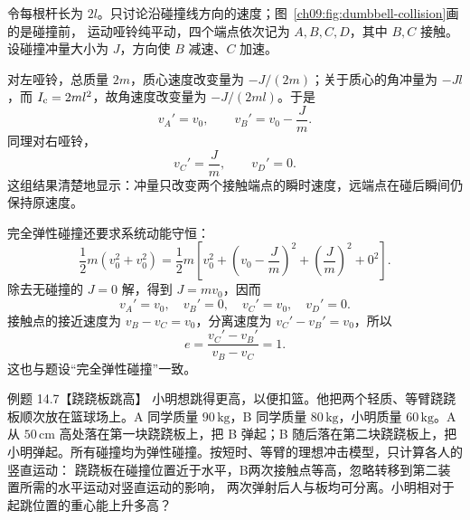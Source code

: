 \begin{xesolution}
令每根杆长为 $2l$。只讨论沿碰撞线方向的速度；图~\ref{ch09:fig:dumbbell-collision}画的是碰撞前，
运动哑铃纯平动，四个端点依次记为
$A,B,C,D$，其中 $B,C$ 接触。设碰撞冲量大小为 $J$，方向使 $B$ 减速、$C$ 加速。

对左哑铃，总质量 $2m$，质心速度改变量为 $-J/(2m)$；关于质心的角冲量为 $-Jl$，而
$I_{\rm c}=2ml^2$，故角速度改变量为 $-J/(2ml)$。于是
\[
 v_A'=v_0,\qquad v_B'=v_0-\frac{J}{m}.
\]
同理对右哑铃，
\[
 v_C'=\frac{J}{m},\qquad v_D'=0.
\]
这组结果清楚地显示：冲量只改变两个接触端点的瞬时速度，远端点在碰后瞬间仍保持原速度。

完全弹性碰撞还要求系统动能守恒：
\[
 \frac12m(v_0^2+v_0^2)
 =\frac12m\left[v_0^2+\left(v_0-\frac Jm\right)^2
 +\left(\frac Jm\right)^2+0^2\right].
\]
除去无碰撞的 $J=0$ 解，得到 $J=mv_0$，因而
\[
 \boxed{v_A'=v_0,\quad v_B'=0,\quad v_C'=v_0,\quad v_D'=0}.
\]
接触点的接近速度为 $v_B-v_C=v_0$，分离速度为 $v_C'-v_B'=v_0$，所以
\[
 \boxed{e=\frac{v_C'-v_B'}{v_B-v_C}=1}.
\]
这也与题设“完全弹性碰撞”一致。
\end{xesolution}

\Needspace{0.38\textheight}
\begin{origexamplebox}{例题 14.7【跷跷板跳高】}
小明想跳得更高，以便扣篮。他把两个轻质、等臂跷跷板顺次放在篮球场上。A 同学质量
$90\,\mathrm{kg}$，B 同学质量 $80\,\mathrm{kg}$，小明质量 $60\,\mathrm{kg}$。A 从
$50\,\mathrm{cm}$ 高处落在第一块跷跷板上，把 B 弹起；B 随后落在第二块跷跷板上，把
小明弹起。所有碰撞均为弹性碰撞。按短时、等臂的理想冲击模型，只计算各人的竖直运动：
跷跷板在碰撞位置近于水平，B两次接触点等高，忽略转移到第二装置所需的水平运动对竖直运动的影响，
两次弹射后人与板均可分离。小明相对于起跳位置的重心能上升多高？
\seesawDiagram
\end{origexamplebox}

